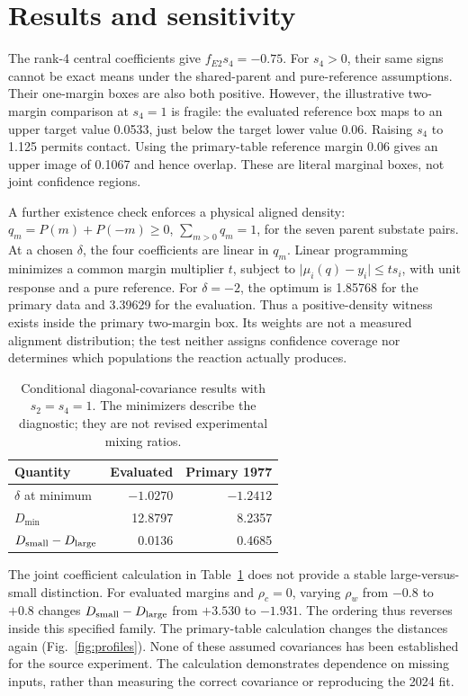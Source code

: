 \documentclass[pdflatex,iicol,sn-mathphys-num]{sn-jnl}
\begin{document}
\section{Results and sensitivity}

The rank-4 central coefficients give \(f_{E2}s_4=-0.75\). For \(s_4>0\), their same signs cannot be exact means under the shared-parent and pure-reference assumptions. Their one-margin boxes are also both positive. However, the illustrative two-margin comparison at \(s_4=1\) is fragile: the evaluated reference box maps to an upper target value 0.0533, just below the target lower value 0.06. Raising \(s_4\) to 1.125 permits contact. Using the primary-table reference margin 0.06 gives an upper image of 0.1067 and hence overlap. These are literal marginal boxes, not joint confidence regions.

A further existence check enforces a physical aligned density: \(q_m=P(m)+P(-m)\ge0\), \(\sum_{m>0}q_m=1\), for the seven parent substate pairs. At a chosen \(\delta\), the four coefficients are linear in \(q_m\). Linear programming minimizes a common margin multiplier \(t\), subject to \(\lvert\mu_i(q)-y_i\rvert\le t s_i\), with unit response and a pure reference. For \(\delta=-2\), the optimum is 1.85768 for the primary data and 3.39629 for the evaluation. Thus a positive-density witness exists inside the primary two-margin box. Its weights are not a measured alignment distribution; the test neither assigns confidence coverage nor determines which populations the reaction actually produces.

\begin{table}[t]
\centering
\caption{Conditional diagonal-covariance results with \(s_2=s_4=1\). The minimizers describe the diagnostic; they are not revised experimental mixing ratios.}
\label{tab:results}
\small
\begin{tabular}{@{}lrr@{}}
\toprule
Quantity & Evaluated & Primary 1977\\
\midrule
\(\delta\) at minimum & \(-1.0270\) & \(-1.2412\)\\
\(D_{\min}\) & 12.8797 & 8.2357\\
\(D_{\rm small}-D_{\rm large}\) & 0.0136 & 0.4685\\
\bottomrule
\end{tabular}
\end{table}

The joint coefficient calculation in Table~\ref{tab:results} does not provide a stable large-versus-small distinction. For evaluated margins and \(\rho_c=0\), varying \(\rho_w\) from \(-0.8\) to \(+0.8\) changes \(D_{\rm small}-D_{\rm large}\) from \(+3.530\) to \(-1.931\). The ordering thus reverses inside this specified family. The primary-table calculation changes the distances again (Fig.~\ref{fig:profiles}). None of these assumed covariances has been established for the source experiment. The calculation demonstrates dependence on missing inputs, rather than measuring the correct covariance or reproducing the 2024 fit.
\end{document}
